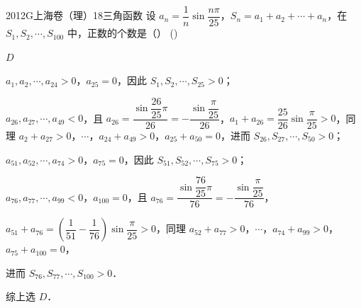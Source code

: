 
\begin{problem}{2012}{G}{上海卷（理）}{18}{三角函数}
设 $ a_n = \dfrac{1}{n} \sin \dfrac{n\pi}{25} $，$ S_n = a_1 + a_2 + \cdots + a_n $，在 $ S_1, S_2, \cdots, S_{100} $ 中，正数的个数是（\hspace{1cm}） (\hspace{1cm})
\begin{choices}
\end{choices}
\end{problem}

\begin{answer}
$ D $
\end{answer}

\begin{solutions}
$ a_1, a_2, \cdots, a_{24} > 0 $，$ a_{25} = 0 $，因此 $ S_1, S_2, \cdots, S_{25} > 0 $；

$ a_{26}, a_{27}, \cdots, a_{49} < 0 $，且 $ a_{26} = \dfrac{\sin \dfrac{26}{25}\pi}{26} = -\dfrac{\sin \dfrac{\pi}{25}}{26} $，$ a_1 + a_{26} = \dfrac{25}{26} \sin \dfrac{\pi}{25} > 0 $，同理 $ a_2 + a_{27} > 0 $，$ \cdots $，$ a_{24} + a_{49} > 0 $，$ a_{25} + a_{50} = 0 $，进而 $ S_{26}, S_{27}, \cdots, S_{50} > 0 $；

$ a_{51}, a_{52}, \cdots, a_{74} > 0 $，$ a_{75} = 0 $，因此 $ S_{51}, S_{52}, \cdots, S_{75} > 0 $；

$ a_{76}, a_{77}, \cdots, a_{99} < 0 $，$ a_{100} = 0 $，且 $ a_{76} = \dfrac{\sin \dfrac{76}{25}\pi}{76} = -\dfrac{\sin \dfrac{\pi}{25}}{76} $，

$ a_{51} + a_{76} = \left( \dfrac{1}{51} - \dfrac{1}{76} \right) \sin \dfrac{\pi}{25} > 0 $，同理 $ a_{52} + a_{77} > 0 $，$ \cdots $，$ a_{74} + a_{99} > 0 $，$ a_{75} + a_{100} = 0 $，

进而 $ S_{76}, S_{77}, \cdots, S_{100} > 0 $．

综上选 $ D $．
\end{solutions}